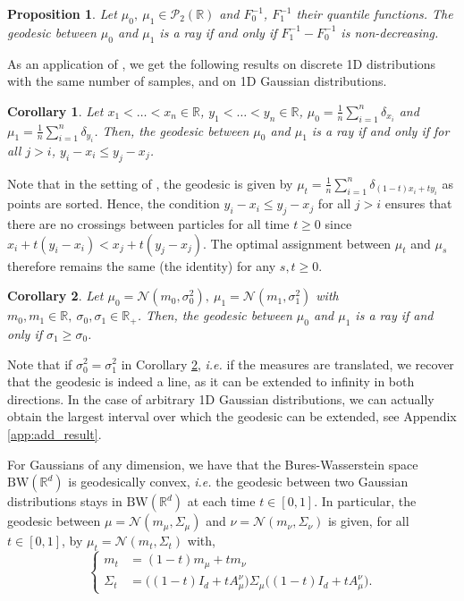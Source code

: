 \documentclass[twoside]{article}
\newtheorem{proposition}{Proposition}
\newtheorem{corollary}{Corollary}
\newcommand{\cN}{\mathcal{N}}
\newcommand{\R}{\mathbb{R}}
\newcommand{\bw}{\mathrm{BW}}
\begin{document}
\begin{proposition} \label{prop:1d_geodesic_rays}
    Let $\mu_0,\ \mu_1\in\mathcal{P}_2(\mathbb{R})$ and $F_0^{-1}$, $F_1^{-1}$ their quantile functions. 
    The geodesic between $\mu_0$ and $\mu_1$ is a ray if and only if $F_1^{-1}-F_0^{-1}$ is non-decreasing.
\end{proposition}

As an application of , we get the following results on discrete 1D distributions with the same number of samples, and on 1D Gaussian distributions.
\begin{corollary} \label{corr:1d_discrete_geod}
    Let $x_1<\dots<x_n\in \R$, $y_1<\dots<y_n\in \R$, $\mu_0=\frac1n\sum_{i=1}^n\delta_{x_i}$ and $\mu_1=\frac1n \sum_{i=1}^n \delta_{y_i}$. Then, the geodesic between $\mu_0$ and $\mu_1$ is a ray if and only if for all $j>i$, $y_i-x_i\le y_j-x_j$.
\end{corollary}
Note that in the setting of , the geodesic is given by $\mu_t=\frac1n \sum_{i=1}^n \delta_{(1-t)x_i+ty_i}$ as points are sorted. Hence, the condition $y_i-x_i\le y_j-x_j$ for all $j>i$ ensures that there are no crossings between particles for all time $t\ge 0$ since $x_i+t(y_i-x_i) < x_j + t(y_j-x_j)$. The optimal assignment between $\mu_t$ and $\mu_s$ therefore remains the same (the identity) for any $s,t\ge 0$.
\begin{corollary} \label{corr:1d_gaussian_geod}
    Let $\mu_0=\cN(m_0,\sigma_0^2),\ \mu_1=\cN(m_1,\sigma_1^2)$ with $m_0,m_1\in \R,\ \sigma_0,\sigma_1\in\R_+$. Then, the geodesic between $\mu_0$ and $\mu_1$ is a ray if and only if $\sigma_1\ge \sigma_0$.
\end{corollary}
Note that if $\sigma_0^2=\sigma_1^2$ in Corollary \ref{corr:1d_gaussian_geod}, \emph{i.e.} if the measures are translated, we recover that the geodesic is indeed a line, as it can be extended to infinity in both directions. In the case of arbitrary 1D Gaussian distributions, we can actually obtain the largest interval over which the geodesic can be extended, see Appendix \ref{app:add_result}.



For Gaussians of any dimension, we have that the Bures-Wasserstein space $\bw(\R^d)$ is geodesically convex, \emph{i.e.} the geodesic between two Gaussian distributions stays in $\bw(\R^d)$ at each time $t\in [0,1]$. In particular, the geodesic between $\mu=\cN(m_\mu,\Sigma_\mu)$ and $\nu=\cN(m_\nu,\Sigma_\nu)$ is given, for all $t\in [0,1]$, by $\mu_t=\cN(m_t,\Sigma_t)$ \citep{altschuler2021averaging} with,
\begin{equation} \label{eq:geodesics_bw}
    \left\{
    \begin{aligned}
        m_t      &= (1-t)m_\mu + t m_\nu \\
        \Sigma_t &= \big((1-t)I_d + t A_\mu^\nu\big)\Sigma_\mu\big((1-t)I_d + t A_\mu^\nu\big).
    \end{aligned}
    \right.
\end{equation}
\end{document}
